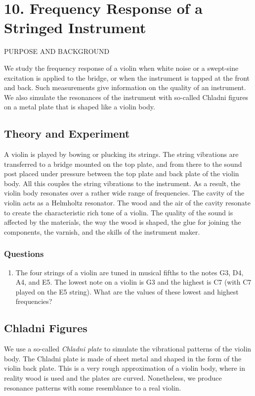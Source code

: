 \documentclass[11pt]{NSF}
\def\ben{\begin{enumerate}}
\def\een{\end{enumerate}}
\begin{document}
\section{10. Frequency Response of a Stringed Instrument}

PURPOSE AND BACKGROUND

We study the frequency response of a violin when white noise or a
swept-sine excitation is applied to the bridge, or when the 
instrument is tapped at the front and back. 
Such measurements give information on the quality of an
instrument. We also simulate the resonances of the instrument with
so-called Chladni figures on a metal plate that is shaped like a
violin body.


\subsection{Theory and Experiment}

A violin is played by bowing or plucking its strings. The string
vibrations are transferred to a bridge mounted on the top plate, and
from there to the sound post placed under pressure between the top
plate and back plate of the violin body. All this couples the string
vibrations to the instrument. As a result, the violin body resonates
over a rather wide range of frequencies. The cavity of the violin acts as a
Helmholtz resonator. The wood and the air of the cavity resonate to
create the characteristic rich tone of a violin. The quality of the
sound is affected by the materials, the way the wood is shaped, the
glue for joining the components, the varnish, and the skills of the
instrument maker.

\subsubsection*{Questions}
\ben
\item
The four strings of a violin are tuned in musical fifths to the
notes G3, D4, A4, and E5. 
The lowest note on a violin is G3 and the highest is C7 
(with C7 played on the E5 string). 
What are the values of these lowest and highest frequencies?

\een

\subsection{Chladni Figures}

We use a so-called {\em Chladni plate} to simulate the vibrational patterns
of the violin body. The Chladni plate is made of sheet metal and
shaped in the form of the violin back plate. This is a very rough
approximation of a violin body, where in reality wood is used and the
plates are curved. Nonetheless, we produce resonance patterns with
some resemblance to a real violin.
\end{document}
